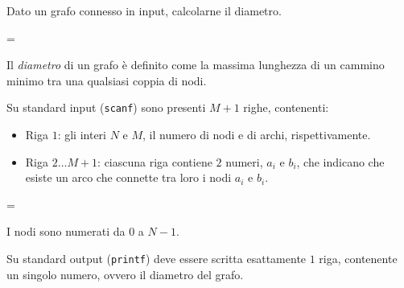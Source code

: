 \usepackage{xcolor}
\usepackage{afterpage}
\usepackage{pifont,mdframed}
\usepackage[bottom]{footmisc}


\renewcommand{\inputfile}{\texttt{stdin}}
\renewcommand{\outputfile}{\texttt{stdout}}
\makeatletter
\renewcommand{\this@inputfilename}{\texttt{stdin}}
\renewcommand{\this@outputfilename}{\texttt{stdout}}
\makeatother


\newenvironment{warning}
  {\par\begin{mdframed}[linewidth=2pt,linecolor=gray]%
    \begin{list}{}{\leftmargin=1cm
                   \labelwidth=\leftmargin}\item[\Large\ding{43}]}
  {\end{list}\end{mdframed}\par}


  Dato un grafo connesso in input, calcolarne il diametro.

\begin{warning}
    Il \textit{diametro} di un grafo è definito come la massima lunghezza di un
    cammino minimo tra una qualsiasi coppia di nodi.
\end{warning}



\InputFile
Su standard input (\texttt{scanf}) sono presenti $M+1$ righe, contenenti:
\begin{itemize}[nolistsep,itemsep=2mm]
\item Riga $1$: gli interi $N$ e $M$, il numero di nodi e di archi, rispettivamente.
\item Riga $2\dots M+1$: ciascuna riga contiene $2$ numeri, $a_i$ e $b_i$,
che indicano che esiste un arco che connette tra loro i nodi $a_i$ e $b_i$.
\end{itemize}
\begin{warning} 
    I nodi sono numerati da $0$ a $N-1$.
\end{warning}

\OutputFile
Su standard output (\texttt{printf}) deve essere scritta esattamente $1$ riga,
contenente un singolo numero, ovvero il diametro del grafo.
	
